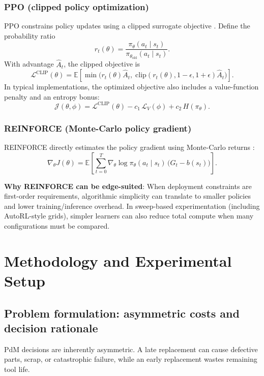 \documentclass[sn-basic]{sn-jnl} %
\begin{document}
\subsubsection{PPO (clipped policy optimization)}
PPO constrains policy updates using a clipped surrogate objective \cite{Schulman2017}. Define the probability ratio
\begin{equation}
 r_t(\theta)=\frac{\pi_\theta(a_t\mid s_t)}{\pi_{\theta_{\mathrm{old}}}(a_t\mid s_t)}.
\end{equation}
With advantage $\hat{A}_t$, the clipped objective is
\begin{equation}
\mathcal{L}^{\mathrm{CLIP}}(\theta)=\mathbb{E}\left[\min\Big(r_t(\theta)\hat{A}_t,\;\mathrm{clip}(r_t(\theta),1-\epsilon,1+\epsilon)\hat{A}_t\Big)\right].
\end{equation}
In typical implementations, the optimized objective also includes a value-function penalty and an entropy bonus:
\begin{equation}
\mathcal{J}(\theta,\phi)=\mathcal{L}^{\mathrm{CLIP}}(\theta) - c_1\,\mathcal{L}_V(\phi) + c_2\,H(\pi_\theta).
\end{equation}

\subsubsection{REINFORCE (Monte-Carlo policy gradient)}
REINFORCE directly estimates the policy gradient using Monte-Carlo returns \cite{Williams1992}:
\begin{equation}
\nabla_\theta J(\theta) = \mathbb{E}\left[\sum_{t=0}^{T} \nabla_\theta \log \pi_\theta(a_t\mid s_t)\,\big(G_t-b(s_t)\big)\right].
\end{equation}

\textbf{Why REINFORCE can be edge-suited}: When deployment constraints are first-order requirements, algorithmic simplicity can translate to smaller policies and lower training/inference overhead. In sweep-based experimentation (including AutoRL-style grids), simpler learners can also reduce total compute when many configurations must be compared. 

\section{Methodology and Experimental Setup}
\label{sec:method}
\subsection{Problem formulation: asymmetric costs and decision rationale}
\label{sec:problem}
PdM decisions are inherently asymmetric. A late replacement can cause defective parts, scrap, or catastrophic failure, while an early replacement wastes remaining tool life.
\end{document}

